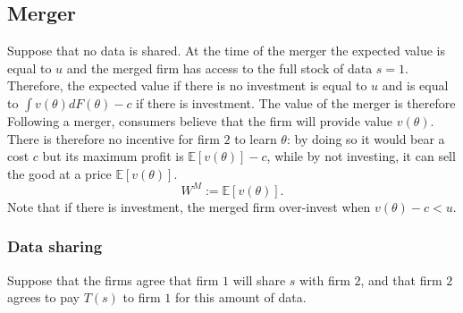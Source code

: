 \documentclass[a4paper,leqno]{article}%
\newcommand{\E}{\mathbb E}
\renewcommand{\t}{\theta}
\begin{document}
\subsection{Merger}
%
Suppose that no data is shared. At the time of the merger the expected value is equal to $u$ and the merged firm has access to the full stock of data $s=1$. Therefore, the expected value if there is no investment is equal to $u$ and is equal to $\int v(\t)dF(\t)-c$ if there is investment. The value of the merger is therefore
%
Following a merger, consumers believe that the firm will provide value $v(\t)$. There is therefore no incentive for firm $2$ to learn $\t$: by doing so it would bear a cost $c$ but its maximum profit is $\E[v(\t)]-c$, while by not investing, it can sell the good at a price $\E[v(\t)]$. 
\[
W^M:=\E[v(\t)].
\]
%
Note that if there is investment, the merged firm over-invest when $v(\t)-c<u$.

\subsubsection{Data sharing}

Suppose that the firms agree that firm $1$ will share $s$ with firm $2$, and that firm $2$ agrees to pay $T(s)$ to firm $1$ for this amount of data. 
\end{document}
